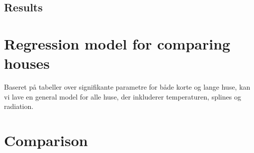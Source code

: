 
\subsection{Results}

\section{Regression model for comparing houses}
Baseret på tabeller over signifikante parametre for både korte og lange huse, kan vi lave en general model for alle huse, der inkluderer temperaturen, splines og radiation.

\section{Comparison}

